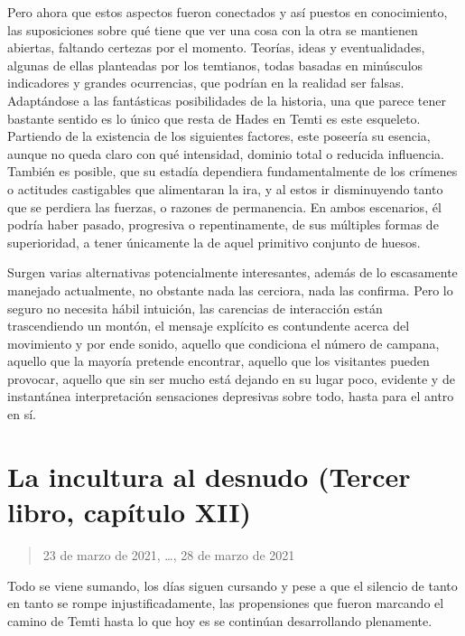 \documentclass[
]{book}
\begin{document}
Pero ahora que estos aspectos fueron conectados y así puestos en conocimiento, las suposiciones sobre qué tiene que ver una cosa con la otra se mantienen abiertas, faltando certezas por el momento. Teorías, ideas y eventualidades, algunas de ellas planteadas por los temtianos, todas basadas en minúsculos indicadores y grandes ocurrencias, que podrían en la realidad ser falsas. Adaptándose a las fantásticas posibilidades de la historia, una que parece tener bastante sentido es lo único que resta de Hades en Temti es este esqueleto. Partiendo de la existencia de los siguientes factores, este poseería su esencia, aunque no queda claro con qué intensidad, dominio total o reducida influencia. También es posible, que su estadía dependiera fundamentalmente de los crímenes o actitudes castigables que alimentaran la ira, y al estos ir disminuyendo tanto que se perdiera las fuerzas, o razones de permanencia. En ambos escenarios, él podría haber pasado, progresiva o repentinamente, de sus múltiples formas de superioridad, a tener únicamente la de aquel primitivo conjunto de huesos.

Surgen varias alternativas potencialmente interesantes, además de lo escasamente manejado actualmente, no obstante nada las cerciora, nada las confirma. Pero lo seguro no necesita hábil intuición, las carencias de interacción están trascendiendo un montón, el mensaje explícito es contundente acerca del movimiento y por ende sonido, aquello que condiciona el número de campana, aquello que la mayoría pretende encontrar, aquello que los visitantes pueden provocar, aquello que sin ser mucho está dejando en su lugar poco, evidente y de instantánea interpretación sensaciones depresivas sobre todo, hasta para el antro en sí.

\hypertarget{la-incultura-al-desnudo-tercer-libro-capuxedtulo-xii}{%
\section{La incultura al desnudo (Tercer libro, capítulo XII)}\label{la-incultura-al-desnudo-tercer-libro-capuxedtulo-xii}}

\begin{quote}
23 de marzo de 2021, \ldots, 28 de marzo de 2021
\end{quote}

Todo se viene sumando, los días siguen cursando y pese a que el silencio de tanto en tanto se rompe injustificadamente, las propensiones que fueron marcando el camino de Temti hasta lo que hoy es se continúan desarrollando plenamente.
\end{document}
